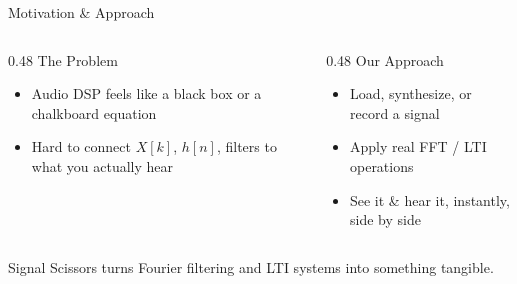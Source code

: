\begin{frame}{Motivation \& Approach}
  \begin{columns}[T, totalwidth=\textwidth]
    \begin{column}{0.48\textwidth}
      \alert{The Problem}
      \begin{itemize}
        \item Audio DSP feels like a \alert{black box} or a chalkboard equation
        \item Hard to connect $X[k]$, $h[n]$, filters to what you actually hear
      \end{itemize}
    \end{column}
    \begin{column}{0.48\textwidth}
      \alert{Our Approach}
      \begin{itemize}
        \item Load, synthesize, or record a signal
        \item Apply real FFT / LTI operations
        \item \alert{See it \& hear it}, instantly, side by side
      \end{itemize}
    \end{column}
  \end{columns}
  \vspace{0.6cm}
  \centering
  {\large\alert{Signal Scissors} turns Fourier filtering and LTI systems into something tangible.}
\end{frame}
